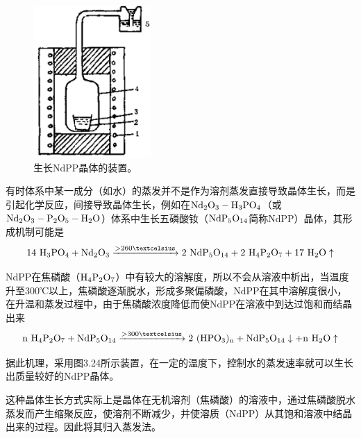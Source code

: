 \begin{figure}[hbt]
 \centering
 \includegraphics[width=0.4\textwidth]{fig/cp03/img3.24.jpg}
 \caption{生长NdPP晶体的装置。}
\end{figure}

有时体系中某一成分（如水）的蒸发并不是作为溶剂蒸发直接导致晶体生长，而是引起化学反应，间接导致晶体生长，例如在$\rm Nd_2O_3-H_3PO_4$（或$\rm Nd_2O_3-P_2O_5-H_2O$）体系中生长五磷酸钕（$\rm NdP_5O_{14}$简称NdPP）晶体，其形成机制可能是
$$ \rm 14\ H_3PO_4 + Nd_2O_3 \xrightarrow{>260℃} 2\ NdP_5O_{14}+2\ H_4P_2O_7+17\ H_2O\uparrow$$

NdPP在焦磷酸（$\rm H_4P_2O_7$）中有较大的溶解度，所以不会从溶液中析出，当温度升至300℃以上，焦磷酸逐渐脱水，形成多聚偏磷酸，NdPP在其中溶解度很小，在升温和蒸发过程中，由于焦磷酸浓度降低而使NdPP在溶液中到达过饱和而结晶出来
$$\rm n\ H_4P_2O_7 + NdP_5O_{14} \xrightarrow{>300℃} 2\ (HPO_3)_n + NdP_5O_{14}\downarrow + n\ H_2O\uparrow $$

据此机理，采用图3.24所示装置，在一定的温度下，控制水的蒸发速率就可以生长出质量较好的NdPP晶体。

这种晶体生长方式实际上是晶体在无机溶剂（焦磷酸）的溶液中，通过焦磷酸脱水蒸发而产生缩聚反应，使溶剂不断减少，并使溶质（NdPP）从其饱和溶液中结晶出来的过程。因此将其归入蒸发法。